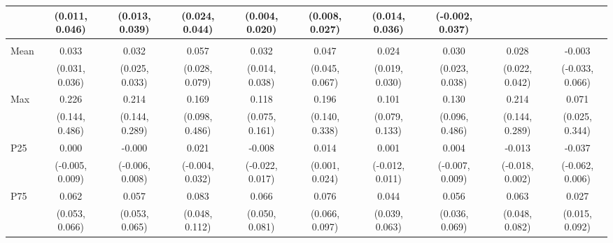{\begin{tabular}{l|c|c|c|c|c|c|c|c|c}
& {\scriptsize (0.011, 0.046)}
& {\scriptsize (0.013, 0.039)}
& {\scriptsize (0.024, 0.044)}
& {\scriptsize (0.004, 0.020)}
& {\scriptsize (0.008, 0.027)}
& {\scriptsize (0.014, 0.036)}
& {\scriptsize (-0.002, 0.037)}
\\ [0.1cm]
\hline
\noalign{\smallskip}
\multicolumn{10}{l}{\textbf{Effect with Leads and Lags}} \\
\noalign{\smallskip}
\hline
Mean
& 0.033 & 0.032 & 0.057 & 0.032 & 0.047 & 0.024 & 0.030 & 0.028 & -0.003 \\
& {\scriptsize (0.031, 0.036)}
& {\scriptsize (0.025, 0.033)}
& {\scriptsize (0.028, 0.079)}
& {\scriptsize (0.014, 0.038)}
& {\scriptsize (0.045, 0.067)}
& {\scriptsize (0.019, 0.030)}
& {\scriptsize (0.023, 0.038)}
& {\scriptsize (0.022, 0.042)}
& {\scriptsize (-0.033, 0.066)}
\\ [0.1cm]
\hline
Max
& 0.226 & 0.214 & 0.169 & 0.118 & 0.196 & 0.101 & 0.130 & 0.214 & 0.071 \\
& {\scriptsize (0.144, 0.486)}
& {\scriptsize (0.144, 0.289)}
& {\scriptsize (0.098, 0.486)}
& {\scriptsize (0.075, 0.161)}
& {\scriptsize (0.140, 0.338)}
& {\scriptsize (0.079, 0.133)}
& {\scriptsize (0.096, 0.486)}
& {\scriptsize (0.144, 0.289)}
& {\scriptsize (0.025, 0.344)}
\\ [0.1cm]
\hline
P25
& 0.000 & -0.000 & 0.021 & -0.008 & 0.014 & 0.001 & 0.004 & -0.013 & -0.037 \\
& {\scriptsize (-0.005, 0.009)}
& {\scriptsize (-0.006, 0.008)}
& {\scriptsize (-0.004, 0.032)}
& {\scriptsize (-0.022, 0.017)}
& {\scriptsize (0.001, 0.024)}
& {\scriptsize (-0.012, 0.011)}
& {\scriptsize (-0.007, 0.009)}
& {\scriptsize (-0.018, 0.002)}
& {\scriptsize (-0.062, 0.006)}
\\ [0.1cm]
\hline
P75
& 0.062 & 0.057 & 0.083 & 0.066 & 0.076 & 0.044 & 0.056 & 0.063 & 0.027 \\
& {\scriptsize (0.053, 0.066)}
& {\scriptsize (0.053, 0.065)}
& {\scriptsize (0.048, 0.112)}
& {\scriptsize (0.050, 0.081)}
& {\scriptsize (0.066, 0.097)}
& {\scriptsize (0.039, 0.063)}
& {\scriptsize (0.036, 0.069)}
& {\scriptsize (0.048, 0.082)}
& {\scriptsize (0.015, 0.092)}
\\ [0.1cm]
\hline
\hline
\end{tabular}
}
